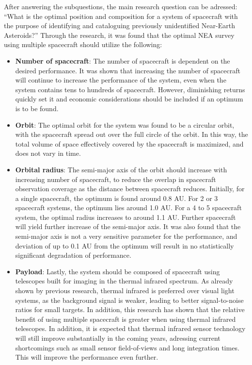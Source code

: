 After answering the subquestions, the main research question can be adressed: ``What is the optimal position and composition for a system of spacecraft with the purpose of identifying and cataloguing previously unidentified Near-Earth Asteroids?'' Through the research, it was found that the optimal NEA survey using multiple spacecraft should utilize the following:
\begin{itemize}
 \item \textbf{Number of spacecraft}: The number of spacecraft is dependent on the desired performance. It was shown that increasing the number of spacecraft will continue to increase the performance of the system, even when the system contains tens to hundreds of spacecraft. However, diminishing returns quickly set it and economic considerations should be included if an optimum is to be found.
 \item \textbf{Orbit}: The optimal orbit for the system was found to be a circular orbit, with the spacecraft spread out over the full circle of the orbit. In this way, the total volume of space effectively covered by the spacecraft is maximized, and does not vary in time.
 \item \textbf{Orbital radius}: The semi-major axis of the orbit should increase with increasing number of spacecraft, to reduce the overlap in spacecraft observation coverage as the distance between spacecraft reduces. Initially, for a single spacecraft, the optimum is found around 0.8 AU. For 2 or 3 spacecraft systems, the optimum lies around 1.0 AU. For a 4 to 5 spacecraft system, the optimal radius increases to around 1.1 AU. Further spacecraft will yield further increase of the semi-major axis. It was also found that the semi-major axis is not a very sensitive parameter for the performance, and deviation of up to 0.1 AU from the optimum will result in no statistically significant degradation of performance.
 \item \textbf{Payload}: Lastly, the system should be composed of spacecraft using telescopes built for imaging in the thermal infrared spectrum. As already shown by previous research, thermal infrared is preferred over visual light systems, as the background signal is weaker, leading to better signal-to-noise ratios for small targets. In addition, this research has shown that the relative benefit of using multiple spacecraft is greater when using thermal infrared telescopes. In addition, it is expected that thermal infrared sensor technology will still improve substantially in the coming years, adressing current shortcomings such as small sensor field-of-views and long integration times. This will improve the performance even further.
\end{itemize}

